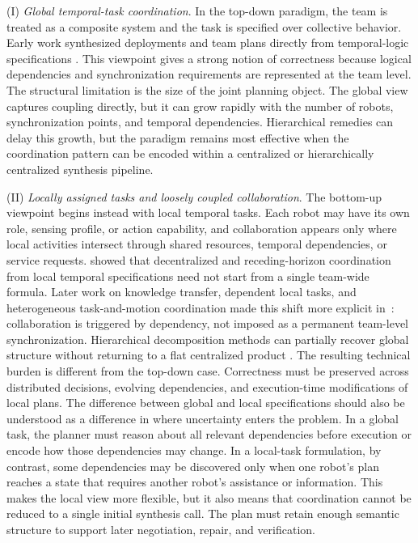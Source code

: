 (I) \emph{Global temporal-task coordination}. In the top-down paradigm, the team
is treated as a composite system and the task is specified over collective behavior. Early
work synthesized deployments and team plans directly from temporal-logic specifications
\citep{kloetzer2010automatic, ding2011automatic}. This viewpoint gives a strong notion of
correctness because logical dependencies and synchronization requirements are represented
at the team level.  The structural limitation is
the size of the joint planning object. The global view captures coupling directly, but it
can grow rapidly with the number of robots, synchronization points, and temporal
dependencies. Hierarchical remedies can delay this growth, but the paradigm remains most
effective when the coordination pattern can be encoded within a centralized or
hierarchically centralized synthesis pipeline.

 (II) \emph{Locally assigned tasks and loosely coupled collaboration}. The
bottom-up viewpoint begins instead with local temporal tasks. Each robot may have its own
role, sensing profile, or action capability, and collaboration appears only where local
activities intersect through shared resources, temporal dependencies, or service requests.
\citet{filippidis2012decentralized, tumova2014receding} showed that decentralized and receding-horizon coordination
from local temporal specifications
need not start from a single team-wide formula. Later work on knowledge transfer,
dependent local tasks, and heterogeneous task-and-motion coordination
made this shift more explicit in~\citet{guo2014distributed, guo2015multi, guo2016task}:
collaboration is triggered by dependency, not imposed as a permanent team-level
synchronization. Hierarchical decomposition methods can partially recover global structure
without returning to a flat centralized product \citep{leahy2021scalable, leahy2022fast,
luo2024decomposition, luo2025hulk}. The resulting technical burden is different from the
top-down case. Correctness must be preserved across distributed decisions, evolving
dependencies, and execution-time modifications of local plans.
The difference between global and local specifications should also be understood as a
difference in where uncertainty enters the problem. In a global task, the planner must
reason about all relevant dependencies before execution or encode how those dependencies
may change. In a local-task formulation, by contrast, some dependencies may be discovered
only when one robot's plan reaches a state that requires another robot's assistance or
information. This makes the local view more flexible, but it also means that coordination
cannot be reduced to a single initial synthesis call. The plan must retain enough semantic
structure to support later negotiation, repair, and verification.


